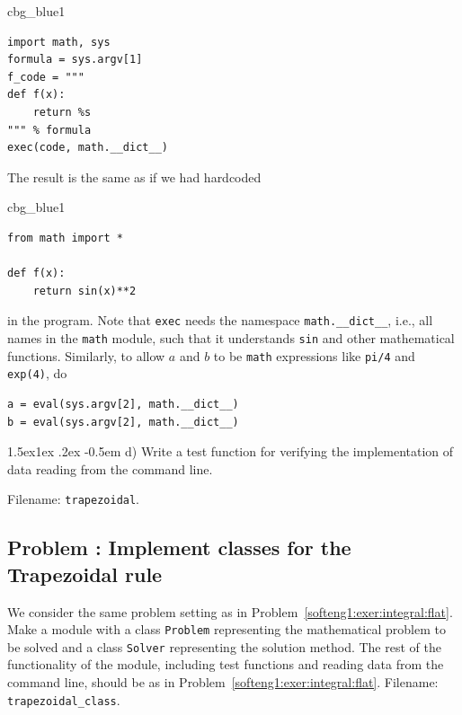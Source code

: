 \documentclass[%
oneside,                 %
final,                   %
10pt]{article}
\makeatletter
\newenvironment{_cod_tight}[1]{
   \def\FrameCommand{\colorbox{#1}}
   \FrameRule0.6pt\MakeFramed {\FrameRestore}\vskip3mm}
   {\vskip0mm\endMakeFramed}
\newenvironment{cod}[1]{
\bgroup\rmfamily
\fboxsep=0mm\relax
\begin{_cod_tight}{#1}
\list{}{\parsep=-2mm\parskip=0mm\topsep=0pt\leftmargin=2mm
\rightmargin=2\leftmargin\leftmargin=4pt\relax}
\item\relax}
{\endlist\end{_cod_tight}\egroup}
\newenvironment{doconceexercise}{}{}
\newcounter{doconceexercisecounter}
\newcommand\subex{\@startsection{paragraph}{4}{\z@}%
                  {1.5ex\@plus1ex \@minus.2ex}%
                  {-0.5em}%
                  {\normalfont\normalsize\bfseries}}
\makeatother
\begin{document}
\begin{doconceexercise}
\begin{cod}{cbg_blue1}\begin{Verbatim}[numbers=none,fontsize=\fontsize{9pt}{9pt},baselinestretch=0.95,xleftmargin=2mm]
import math, sys
formula = sys.argv[1]
f_code = """
def f(x):
    return %s
""" % formula
exec(code, math.__dict__)
\end{Verbatim}
\end{cod}
\noindent
The result is the same as if we had hardcoded

\begin{cod}{cbg_blue1}\begin{Verbatim}[numbers=none,fontsize=\fontsize{9pt}{9pt},baselinestretch=0.95,xleftmargin=2mm]
from math import *

def f(x):
    return sin(x)**2
\end{Verbatim}
\end{cod}
\noindent
in the program. Note that \texttt{exec} needs the namespace
\Verb!math.__dict__!, i.e., all names in the \texttt{math} module, such that
it understands \texttt{sin} and other mathematical functions.
Similarly, to allow $a$ and $b$ to be \texttt{math} expressions like \texttt{pi/4}
and \texttt{exp(4)}, do

\begin{Verbatim}[frame=lines,label=\fbox{{\tiny Terminal}},framesep=2.5mm,framerule=0.7pt,fontsize=\fontsize{9pt}{9pt}]
a = eval(sys.argv[2], math.__dict__)
b = eval(sys.argv[2], math.__dict__)
\end{Verbatim}


\subex{d)}
Write a test function for verifying the implementation of
data reading from the command line.

\noindent Filename: \texttt{trapezoidal}.

\end{doconceexercise}




\begin{doconceexercise}

\subsection*{Problem \thedoconceexercisecounter: Implement classes for the Trapezoidal rule}

\label{softeng1:exer:integral:flat2}

We consider the same problem setting as in Problem~\ref{softeng1:exer:integral:flat}. Make a module with a class \texttt{Problem}
representing the mathematical problem to be solved and a class
\texttt{Solver} representing the solution method.  The rest of the
functionality of the module, including test functions and reading data
from the command line, should be as in Problem~\ref{softeng1:exer:integral:flat}.
\noindent Filename: \Verb!trapezoidal_class!.

\end{doconceexercise}
\end{document}
